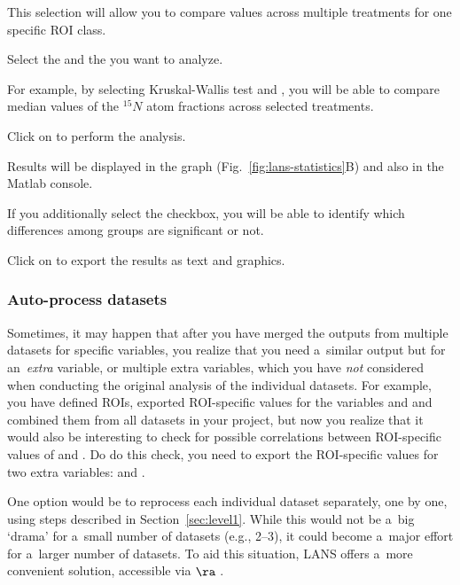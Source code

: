 \bul This selection will allow you to compare values across multiple treatments for one specific ROI class.

\s Select the  and the  you want to analyze.

\bul For example, by selecting Kruskal-Wallis test and , you will be able to compare median values of the ${}^{15}N$ atom fractions across selected treatments.

\s Click on  to perform the analysis. 

\bul Results will be displayed in the graph (Fig.~\ref{fig:lans-statistics}B) and also in the Matlab console.

\bul If you additionally select the  checkbox, you will be able to identify which differences among groups are significant or not.

\s Click on  to export the results as text and graphics.


\subsubsection{Auto-process datasets}
\setcounter{step}{0}

Sometimes, it may happen that after you have merged the outputs from multiple datasets for specific variables, you realize that you need a~similar output but for an~\emph{extra} variable, or multiple extra variables, which you have \emph{not} considered when conducting the original analysis of the individual datasets. For example, you have defined ROIs, exported ROI-specific values for the variables  and  and combined them from all datasets in your project, but now you realize that it would also be interesting to check for possible correlations between ROI-specific values of  and . Do do this check, you need to export the ROI-specific values for two extra variables:  and . 

One option would be to reprocess each individual dataset separately, one by one, using steps described in Section~\ref{sec:level1}. While this would not be a~big `drama' for a~small number of datasets (e.g., 2--3), it could become a~major effort for a~larger number of datasets. To aid this situation, LANS offers a~more convenient solution, accessible via  $\ra$ .

